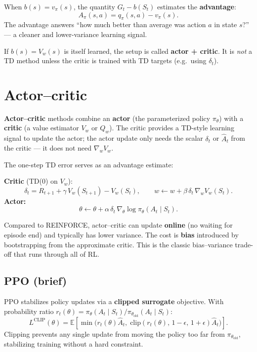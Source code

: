 \documentclass[11pt, oneside]{book}
\newcommand{\E}{\mathbb{E}}
\begin{document}
\begin{defbox}[title={Advantage Function}]
When $b(s) = v_\pi(s)$, the quantity $G_t - b(S_t)$ estimates the
\textbf{advantage}:
\[
  A_\pi(s,a) = q_\pi(s,a) - v_\pi(s).
\]
The advantage answers ``how much better than average was action $a$ in state
$s$?'' --- a cleaner and lower-variance learning signal.
\end{defbox}

If $b(s) = V_w(s)$ is itself learned, the setup is called
\textbf{actor + critic}. It is \emph{not} a TD method unless the critic is
trained with TD targets (e.g.\ using $\delta_t$).

\section{Actor--critic}

\textbf{Actor--critic} methods combine an \textbf{actor}
(the parameterized policy $\pi_\theta$) with a \textbf{critic} (a value
estimator $V_w$ or $Q_w$). The critic provides a TD-style learning signal to
update the actor; the actor update only needs the scalar $\delta_t$ or
$\hat{A}_t$ from the critic --- it does not need $\nabla_w V_w$.

The one-step TD error serves as an advantage estimate:

\begin{thmbox}[title={Actor--Critic Updates}]
\textbf{Critic} (TD(0) on $V_w$):
\[
  \delta_t = R_{t+1} + \gamma\,V_w(S_{t+1}) - V_w(S_t), \qquad
  w \leftarrow w + \beta\,\delta_t\,\nabla_w V_w(S_t).
\]
\textbf{Actor:}
\[
  \theta \leftarrow \theta + \alpha\,\delta_t\,\nabla_\theta\log\pi_\theta(A_t\mid S_t).
\]
\end{thmbox}

\begin{intbox}[title={REINFORCE vs.\ Actor--Critic}]
Compared to REINFORCE, actor--critic can update \textbf{online} (no waiting
for episode end) and typically has lower variance. The cost is
\textbf{bias} introduced by bootstrapping from the approximate critic.
This is the classic bias--variance trade-off that runs through all of RL.
\end{intbox}

\subsection{PPO (brief)}

\begin{thmbox}[title={Proximal Policy Optimization (PPO)}]
PPO stabilizes policy updates via a \textbf{clipped surrogate} objective.
With probability ratio $r_t(\theta) = \pi_\theta(A_t\mid S_t) /
\pi_{\theta_\text{old}}(A_t\mid S_t)$:
\[
  L^\text{CLIP}(\theta) = \E\!\left[\min\bigl(r_t(\theta)\hat{A}_t,\;
    \mathrm{clip}(r_t(\theta),\,1-\epsilon,\,1+\epsilon)\hat{A}_t\bigr)\right].
\]
Clipping prevents any single update from moving the policy too far from
$\pi_{\theta_\text{old}}$, stabilizing training without a hard constraint.
\end{thmbox}
\end{document}
